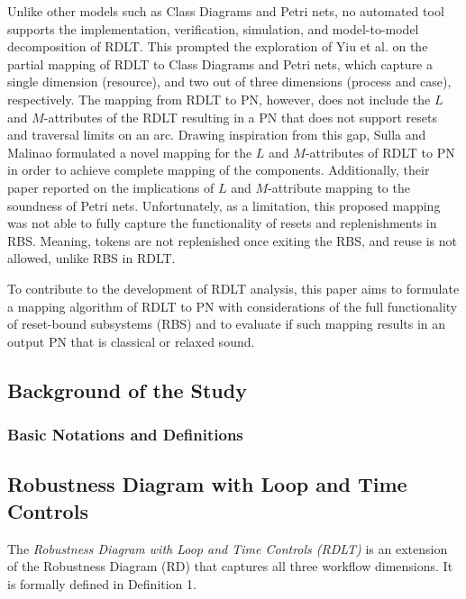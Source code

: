 \documentclass[12pt]{article}
\begin{document}
Unlike other models such as Class Diagrams and Petri nets, no automated tool supports the implementation, verification, simulation, and model-to-model decomposition of RDLT. This prompted the exploration of Yiu et al. \cite{yiu} on the partial mapping of RDLT to Class Diagrams and Petri nets, which capture a single dimension (resource), and two out of three dimensions (process and case), respectively. The mapping from RDLT to PN, however, does not include the $L$ and $M$-attributes of the RDLT resulting in a PN that does not support resets and traversal limits on an arc. Drawing inspiration from this gap, Sulla and Malinao \cite{sulla-malinao} formulated a novel mapping for the $L$ and $M$-attributes of RDLT to PN in order to achieve complete mapping of the components. Additionally, their paper reported on the implications of $L$ and $M$-attribute mapping to the soundness of Petri nets. Unfortunately, as a limitation, this proposed mapping was not able to fully capture the functionality of resets and replenishments in RBS. Meaning, tokens are not replenished once exiting the RBS, and reuse is not allowed, unlike RBS in RDLT. \par

To contribute to the development of RDLT analysis, this paper aims to formulate a mapping algorithm of RDLT to PN with considerations of the full functionality of reset-bound subsystems (RBS) and to evaluate if such mapping results in an output PN that is classical or relaxed sound.
    
    \subsection{Background of the Study}
        \subsubsection{Basic Notations and Definitions}
        \subsection*{Robustness Diagram with Loop and Time Controls}
        The \textit{Robustness Diagram with Loop and Time Controls (RDLT)} is an extension of the Robustness Diagram (RD) that captures all three workflow dimensions. It is formally defined in Definition 1.

        \newtheorem{definition}{Definition}
\end{document}
